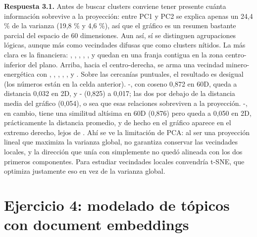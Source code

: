 \textbf{Respuesta 3.1.} Antes de buscar clusters conviene tener presente cuánta información sobrevive a la proyección: entre PC1 y PC2 se explica apenas un 24,4 \% de la varianza (19,8 \% y 4,6 \%), así que el gráfico es un resumen bastante parcial del espacio de 60 dimensiones. Aun así, sí se distinguen agrupaciones lógicas, aunque más como vecindades difusas que como clusters nítidos. La más clara es la financiera: , , , , ,  y  quedan en una franja contigua en la zona centro-inferior del plano. Arriba, hacia el centro-derecha, se arma una vecindad minero-energética con , , , , ,  y . Sobre las cercanías puntuales, el resultado es desigual (los números están en la celda anterior). -, con coseno 0,872 en 60D, queda a distancia 0,032 en 2D, y - (0,825) a 0,017; las dos por debajo de la distancia media del gráfico (0,054), o sea que esas relaciones sobreviven a la proyección. -, en cambio, tiene una similitud altísima en 60D (0,876) pero queda a 0,050 en 2D, prácticamente la distancia promedio, y de hecho en el gráfico  aparece en el extremo derecho, lejos de . Ahí se ve la limitación de PCA: al ser una proyección lineal que maximiza la varianza global, no garantiza conservar las vecindades locales, y la dirección que unía  con  simplemente no quedó alineada con los dos primeros componentes. Para estudiar vecindades locales convendría t-SNE, que optimiza justamente eso en vez de la varianza global.

\section{Ejercicio 4: modelado de tópicos con document embeddings}

